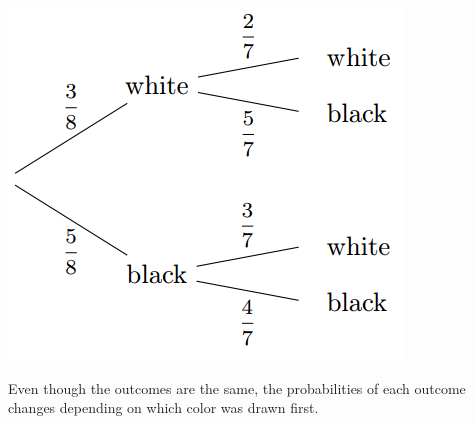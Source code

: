 \documentclass{ximera}
\begin{document}
\begin{image}
\includegraphics{ProbTree2}
\end{image}

Even though the outcomes are the same, the probabilities of each outcome changes depending on which color was drawn first.
\end{document}
